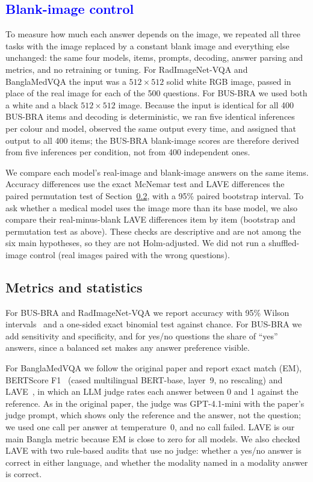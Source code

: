 \documentclass[doublecolumn]{ijcvsplatex}
\begin{document}
\subsection{\textcolor{blue}{Blank-image control}}
\label{sec_blank_method}
{\color{blue}
To measure how much each answer depends on the image, we repeated all three tasks with the image replaced by a constant blank image and everything else unchanged: the same four models, items, prompts, decoding, answer parsing and metrics, and no retraining or tuning. For RadImageNet-VQA and BanglaMedVQA the input was a $512\times512$ solid white RGB image, passed in place of the real image for each of the 500 questions. For BUS-BRA we used both a white and a black $512\times512$ image. Because the input is identical for all 400 BUS-BRA items and decoding is deterministic, we ran five identical inferences per colour and model, observed the same output every time, and assigned that output to all 400 items; the BUS-BRA blank-image scores are therefore derived from five inferences per condition, not from 400 independent ones.

We compare each model's real-image and blank-image answers on the same items. Accuracy differences use the exact McNemar test and LAVE differences the paired permutation test of Section~\ref{sec_stats}, with a 95\% paired bootstrap interval. To ask whether a medical model uses the image more than its base model, we also compare their real-minus-blank LAVE differences item by item (bootstrap and permutation test as above). These checks are descriptive and are not among the six main hypotheses, so they are not Holm-adjusted. We did not run a shuffled-image control (real images paired with the wrong questions).
}

\subsection{Metrics and statistics}
\label{sec_stats}
For BUS-BRA and RadImageNet-VQA we report accuracy with 95\% Wilson intervals~\cite{wilson1927} and a one-sided exact binomial test against chance. For BUS-BRA we add sensitivity and specificity, and for yes/no questions the share of ``yes'' answers, since a balanced set makes any answer preference visible.

For BanglaMedVQA we follow the original paper and report exact match (EM), BERTScore F1~\cite{zhang2020bertscore} (cased multilingual BERT-base, layer~9, no rescaling) and LAVE~\cite{manas2024lave}, in which an LLM judge rates each answer between 0 and 1 against the reference. As in the original paper, the judge was GPT-4.1-mini with the paper's judge prompt, which shows only the reference and the answer, not the question; we used one call per answer at temperature~0, and no call failed. LAVE is our main Bangla metric because EM is close to zero for all models. We also checked LAVE with two rule-based audits that use no judge: whether a yes/no answer is correct in either language, and whether the modality named in a modality answer is correct.
\end{document}
